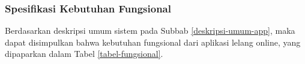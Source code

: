   \subsubsection{Spesifikasi Kebutuhan Fungsional}
  \label{keb-fungsional}
	Berdasarkan deskripsi umum sistem pada Subbab \ref{deskripsi-umum-app}, maka dapat disimpulkan bahwa kebutuhan fungsional dari aplikasi lelang online, yang dipaparkan dalam Tabel \ref{tabel-fungsional}.

  